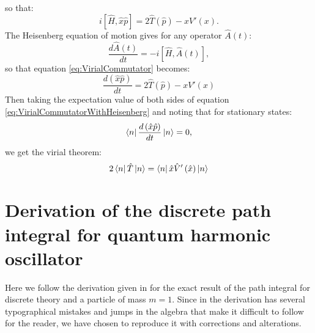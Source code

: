 \documentclass[12pt]{article}
\begin{document}
        so that:
        \begin{equation}
            \label{eq:VirialCommutator}
            i\left[\hat{H},\hat{x}\hat{p}\right] = 2\hat{T}\left(\hat{p}\right)-xV'\left(x\right).
        \end{equation}
        The Heisenberg equation of motion gives for any operator $\hat{A}\left(t\right)$:
        \begin{equation}
            \label{eq:HeisenbergEquationOfMotion}
            \frac{d\hat{A}\left(t\right)}{dt} = -i\left[\hat{H},\hat{A}\left(t\right)\right],
        \end{equation}
        so that equation \ref{eq:VirialCommutator} becomes:
        \begin{equation}
            \label{eq:VirialCommutatorWithHeisenberg}
            \frac{d\left(\hat{x}\hat{p}\right)}{dt} = 2\hat{T}\left(\hat{p}\right)-xV'\left(x\right)
        \end{equation}
        Then taking the expectation value of both sides of equation \ref{eq:VirialCommutatorWithHeisenberg} and noting that for stationary states:
        \begin{equation}
            \label{eq:VanishingExpectationOfTimeDerivative}
            \bra{n} \frac{d\left(\hat{x}\hat{p}\right)}{dt} \ket{n} = 0,
        \end{equation}
        we get the virial theorem:
        \begin{equation}
            \label{eq:VirialTheoremAppendix}
            2\bra{n} \hat{T} \ket{n} = \bra{n} \hat{x} \hat{V}'\left(\hat{x}\right) \ket{n}
        \end{equation}




    \section{Derivation of the discrete path integral for quantum harmonic oscillator}
        \label{ap:DiscretePathIntegralDerivation}
        Here we follow the derivation given in \cite{creutz_freedman_1981} for the exact result of the path integral for discrete theory and a particle of mass $m=1$. Since in \cite{creutz_freedman_1981} the derivation has several typographical mistakes and jumps in the algebra that make it difficult to follow for the reader, we have chosen to reproduce it with corrections and alterations.
\end{document}
